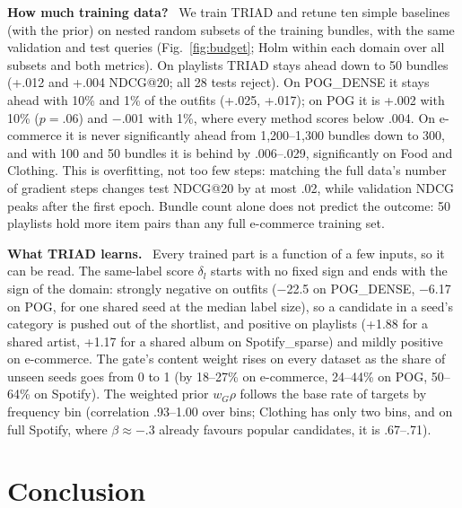 \documentclass[runningheads]{llncs}
\newcommand{\deltab}{\delta}
\renewcommand{\paragraph}[1]{\smallskip\noindent\textbf{#1}\ }
\begin{document}
\paragraph{How much training data?} We train TRIAD and retune ten simple baselines (with the prior) on nested random
subsets of the training bundles, with the same validation and test queries (Fig.~\ref{fig:budget}; Holm within each
domain over all subsets and both metrics). On playlists TRIAD stays ahead down to 50 bundles (+.012 and +.004 NDCG@20;
all 28 tests reject). On POG\_DENSE it stays ahead with 10\% and 1\% of the outfits (+.025, +.017); on POG it is
+.002 with 10\% ($p=.06$) and $-$.001 with 1\%, where every method scores below .004. On e-commerce it is never
significantly ahead from 1,200--1,300 bundles down to 300, and with 100 and 50 bundles it is behind by .006--.029,
significantly on Food and Clothing. This is overfitting, not too few steps: matching the full data's number of
gradient steps changes test NDCG@20 by at most .02, while validation NDCG peaks after the first epoch. Bundle count
alone does not predict the outcome: 50 playlists hold more item pairs than any full e-commerce training set.

\paragraph{What TRIAD learns.} Every trained part is a function of a few inputs, so it can be read. The same-label
score $\deltab_l$ starts with no fixed sign and ends with the sign of the domain: strongly negative on outfits
($-$22.5 on POG\_DENSE, $-$6.17 on POG, for one shared seed at the median label size), so a candidate in a seed's
category is pushed out of the shortlist, and positive on playlists (+1.88 for a shared artist, +1.17 for a shared
album on Spotify\_sparse) and mildly positive on e-commerce. The gate's content weight rises on every dataset as the
share of unseen seeds goes from 0 to 1 (by 18--27\% on e-commerce, 24--44\% on POG, 50--64\% on Spotify). The
weighted prior $w_G\rho$ follows the base rate of targets by frequency bin (correlation .93--1.00 over bins; Clothing has only two bins, and on full
Spotify, where $\beta\approx-.3$ already favours popular candidates, it is .67--.71).

\section{Conclusion}
\end{document}
